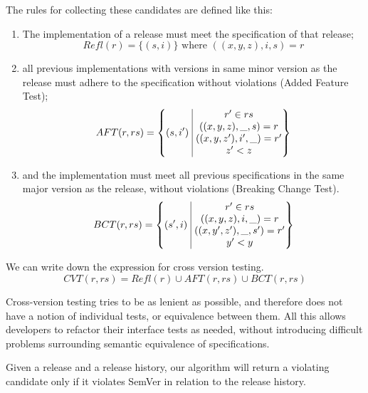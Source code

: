 The rules for collecting these candidates are defined like this:
\begin{enumerate}
\item The implementation of a release must meet the specification of
  that release;
  $$ Refl(r) = \{(s, i)\} \text{ where } ((x,y,z), i, s) = r $$

    \item all previous implementations with versions in same minor
      version as the release must adhere to the specification
      without violations (Added Feature Test);
    $$AFT(r, rs) = \left\{ (s, i')\ \vline\ 
        \begin{matrix}
            r' \in rs \\
        ((x,y,z), \_, s) = r \\ 
        ((x,y,z'), i', \_) = r'\\
        z' < z \\
        \end{matrix}
    \right\}$$

    \item and the implementation must meet all previous
      specifications in the same major version as the release,
      without violations (Breaking Change Test).
    $$BCT(r, rs) = \left\{ (s', i)\ \vline\ 
        \begin{matrix}
            r' \in rs \\
        ((x, y, z), i, \_) = r \\ 
        ((x, y', z'), \_, s') = r'\\
        y' < y \\
        \end{matrix}
    \right\}$$
\end{enumerate}

We can write down the expression for cross version testing. 
$$ CVT(r, rs) = Refl(r) \cup AFT(r, rs) \cup BCT(r, rs) $$

Cross-version testing tries to be as lenient as possible, and therefore
does not have a notion of individual tests, or equivalence between
them. All this allows developers to refactor their interface tests as
needed, without introducing difficult problems surrounding semantic
equivalence of specifications. 

\begin{theorem}[Soundness]
Given a release and a release history, our algorithm will return a 
violating candidate only if it violates SemVer in
relation to the release history.
\end{theorem}

